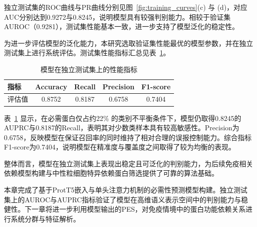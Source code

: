独立测试集的ROC曲线与PR曲线分别见图~\ref{fig:training_curves}(c) 与 (d)，对应AUC分别达到0.9272与0.8245，说明模型具有较强判别能力。相较于验证集AUROC（0.9281），测试集性能基本一致，进一步支持了模型泛化的稳定性。

为进一步评估模型的泛化能力，本研究选取验证集性能最优的模型参数，并在独立测试集上进行系统评估。测试集性能指标汇总见表~\ref{tab:test_metrics}。

\begin{table}[!htbp]
\centering
\caption{模型在独立测试集上的性能指标}
\label{tab:test_metrics}
\begin{tabular}{lcccc}
\toprule
指标 & Accuracy & Recall & Precision & F1-score \\
\midrule
评估值 & 0.8752 & 0.8187 & 0.6758 & 0.7404 \\
\bottomrule
\end{tabular}
\end{table}

表~\ref{tab:test_metrics} 显示，在必需蛋白仅占约22\% 的类别不平衡条件下，模型仍取得0.8245的AUPRC与0.8187的Recall，表明其对少数类样本具有较高敏感性。Precision为0.6758，反映模型在保证召回率的同时维持了相对合理的误报控制能力。综合指标F1-score为0.7404，说明模型在精准度与覆盖度之间取得了较为均衡的表现。

整体而言，模型在独立测试集上表现出稳定且可泛化的判别能力，为后续免疫相关依赖模型构建与中性粒细胞特异依赖蛋白筛选提供了可靠的算法基础。

\FloatBarrier

本章完成了基于ProtT5嵌入与单头注意力机制的必需性预测模型构建。独立测试集上的AUROC与AUPRC指标验证了模型在高维语义表示空间中的判别能力与稳健性。下一章将进一步利用模型输出的PES，对免疫情境中的蛋白功能依赖关系进行系统分群与特征解析。
